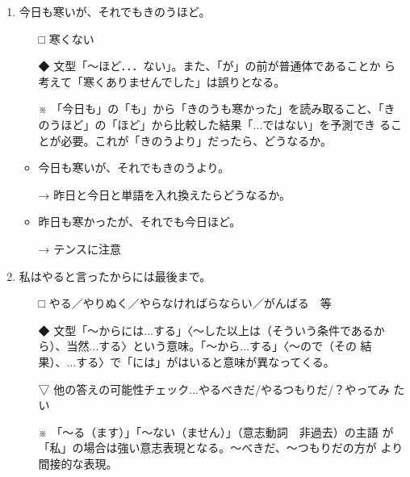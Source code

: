 \documentclass[
uplatex,
b5paper,
10pt,
dvipdfmx
]{jsbook}
\begin{document}
\begin{enumerate}
 \item 今日も寒いが、それでもきのうほど\underline{\hspace{3zw}}。

\begin{itemize}
\item[□] 寒くない
\item[◆] 文型「〜ほど．．．ない」。また、「が」の前が普通体であることか
	  ら考えて「寒くありませんでした」は誤りとなる。
\item[※] 「今日も」の「も」から「きのうも寒かった」を読み取ること、「き
	  のうほど」の「ほど」から比較した結果「...ではない」を予測でき
	  ることが必要。これが「きのうより」だったら、どうなるか。
\end{itemize}

\begin{itemize}
\item 今日も寒いが、それでもきのうより\underline{\hspace{3zw}}。
\item[→] 昨日と今日と単語を入れ換えたらどうなるか。
\item 昨日も寒かったが、それでも今日ほど\underline{\hspace{3zw}}。
\item[→] テンスに注意
\end{itemize}

\item 私はやると言ったからには最後まで\underline{\hspace{3zw}}。

\begin{itemize}
\item[□] やる／やりぬく／やらなければらならい／がんばる　等
\item[◆] 文型「〜からには...する」〈〜した以上は（そういう条件であるか
	  ら）、当然...する〉という意味。「〜から...する」〈〜ので（その
	  結果）、...する〉で「には」がはいると意味が異なってくる。
\item[▽] 他の答えの可能性チェック...やるべきだ/やるつもりだ/？やってみ
	  たい
\item[※] 「〜る（ます）」「〜ない（ません）」（意志動詞　非過去）の主語
	  が「私」の場合は強い意志表現となる。〜べきだ、〜つもりだの方が
	  より間接的な表現。
\end{itemize}


\end{enumerate}
\end{document}
